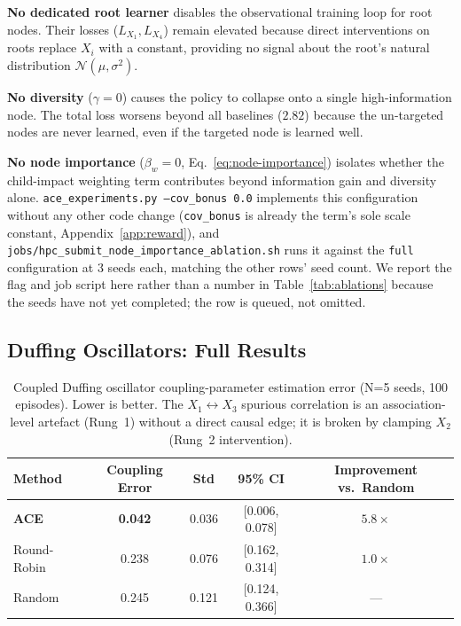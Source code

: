 \documentclass[twoside]{article}
\theoremstyle{plain}
\theoremstyle{definition}
\theoremstyle{remark}
\begin{document}
\textbf{No dedicated root learner} disables the observational training loop for root nodes. Their losses ($L_{X_1}, L_{X_4}$) remain elevated because direct interventions on roots replace $X_i$ with a constant, providing no signal about the root's natural distribution $\mathcal{N}(\mu, \sigma^2)$.

\textbf{No diversity} ($\gamma=0$) causes the policy to collapse onto a single high-information node. The total loss worsens beyond all baselines ($2.82$) because the un-targeted nodes are never learned, even if the targeted node is learned well.

\textbf{No node importance} ($\beta_w=0$, Eq.~\ref{eq:node-importance}) isolates whether the child-impact weighting term contributes beyond information gain and diversity alone. \texttt{ace\_experiments.py --cov\_bonus 0.0} implements this configuration without any other code change (\texttt{cov\_bonus} is already the term's sole scale constant, Appendix~\ref{app:reward}), and \texttt{jobs/hpc\_submit\_node\_importance\_ablation.sh} runs it against the \texttt{full} configuration at 3 seeds each, matching the other rows' seed count. We report the flag and job script here rather than a number in Table~\ref{tab:ablations} because the seeds have not yet completed; the row is queued, not omitted.

\subsection{Duffing Oscillators: Full Results}
\label{app:duffing}

\begin{table}[h]
\centering
\caption{Coupled Duffing oscillator coupling-parameter estimation error (N=5 seeds, 100 episodes). Lower is better. The $X_1 \leftrightarrow X_3$ spurious correlation is an association-level artefact (Rung~1) without a direct causal edge; it is broken by clamping $X_2$ (Rung~2 intervention).}
\label{tab:duffing-full}
\small
\begin{tabular}{@{}lcccc@{}}
\toprule
Method & Coupling Error & Std & 95\% CI & Improvement vs.\ Random \\
\midrule
\textbf{ACE} & \textbf{0.042} & 0.036 & [0.006, 0.078] & $5.8\times$ \\
Round-Robin  & 0.238 & 0.076 & [0.162, 0.314] & $1.0\times$ \\
Random       & 0.245 & 0.121 & [0.124, 0.366] & --- \\
\bottomrule
\end{tabular}
\end{table}
\end{document}
